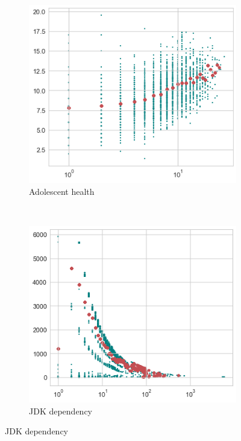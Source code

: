 \documentclass[../document.tex]{subfiles}
\begin{document}
\begin{figure}[h]
    \centering
    \begin{subfigure}[b]{0.3\textwidth}
        \includegraphics[width=\textwidth]{img/scatter_0}
        \caption*{Adolescent health}
    \end{subfigure}
    ~
    \begin{subfigure}[b]{0.3\textwidth}
        \includegraphics[width=\textwidth]{img/scatter_1}
        \caption*{JDK dependency}
    \end{subfigure}

\end{figure}
\end{document}
